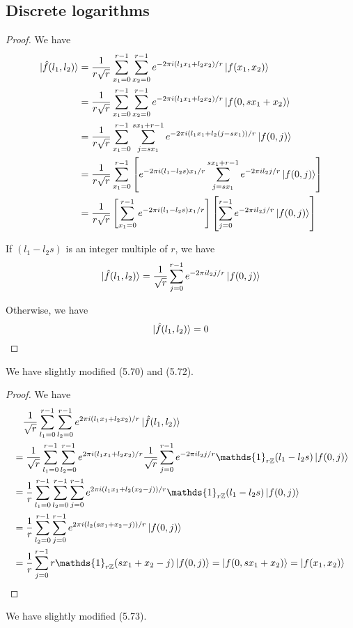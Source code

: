\documentclass[../main.tex]{subfiles}
\begin{document}
\subsection{Discrete logarithms}
\begin{exercise}
\end{exercise}
\begin{proof}
We have
\begin{align*}
    \ket{\hat{f}(l_1,l_2)}
    &= \frac{1}{r\sqrt{r}} \sum_{x_1=0}^{r-1}\sum_{x_2=0}^{r-1}e^{-2\pi i(l_1x_1+l_2x_2)/r}\ket{f(x_1,x_2)} \\
    &= \frac{1}{r\sqrt{r}} \sum_{x_1=0}^{r-1}\sum_{x_2=0}^{r-1}e^{-2\pi i(l_1x_1+l_2x_2)/r}\ket{f(0,s x_1+x_2)} \\
    &= \frac{1}{r\sqrt{r}} \sum_{x_1=0}^{r-1}\sum_{j=s x_1}^{s x_1+r-1}e^{-2\pi i(l_1x_1+l_2(j-s x_1))/r}\ket{f(0,j)} \\
    &= \frac{1}{r\sqrt{r}} \sum_{x_1=0}^{r-1}\left[e^{-2\pi i(l_1-l_2 s)x_1/r}\sum_{j=s x_1}^{s x_1+r-1}e^{-2\pi i l_2 j/r}\ket{f(0,j)}\right] \\
    &= \frac{1}{r\sqrt{r}} \left[\sum_{x_1=0}^{r-1}e^{-2\pi i(l_1-l_2 s)x_1/r}\right]\left[\sum_{j=0}^{r-1}e^{-2\pi i l_2 j/r}\ket{f(0,j)}\right]
\end{align*}

If $(l_1-l_2 s)$ is an integer multiple of $r$, we have
\[
    \ket{\hat{f}(l_1,l_2)}=\frac{1}{\sqrt{r}}\sum_{j=0}^{r-1}e^{-2\pi i l_2 j/r}\ket{f(0,j)}
\]

Otherwise, we have
\[
    \ket{\hat{f}(l_1,l_2)}=0
\]
\end{proof}
\begin{remark}
We have slightly modified (5.70) and (5.72).
\end{remark}

\bigskip
\begin{exercise}
\end{exercise}
\begin{proof}
We have
\begin{align*}
    &\quad\frac{1}{\sqrt{r}}\sum_{l_1=0}^{r-1}\sum_{l_2=0}^{r-1}e^{2\pi i(l_1x_1+l_2x_2)/r}\ket{\hat{f}(l_1,l_2)} \\
    &= \frac{1}{\sqrt{r}}\sum_{l_1=0}^{r-1}\sum_{l_2=0}^{r-1}e^{2\pi i(l_1x_1+l_2x_2)/r}\frac{1}{\sqrt{r}}\sum_{j=0}^{r-1}e^{-2\pi i l_2 j/r}\mathds{1}_{r\mathbb{Z}}(l_1-l_2s)\ket{f(0,j)} \\
    &= \frac{1}{r}\sum_{l_1=0}^{r-1}\sum_{l_2=0}^{r-1}\sum_{j=0}^{r-1}e^{2\pi i(l_1x_1+l_2(x_2-j))/r}\mathds{1}_{r\mathbb{Z}}(l_1-l_2s)\ket{f(0,j)} \\
    &= \frac{1}{r}\sum_{l_2=0}^{r-1}\sum_{j=0}^{r-1}e^{2\pi i(l_2(s x_1+x_2-j))/r}\ket{f(0,j)} \\
    &= \frac{1}{r}\sum_{j=0}^{r-1}r\mathds{1}_{r\mathbb{Z}}(s x_1+x_2-j)\ket{f(0,j)} = \ket{f(0,s x_1+x_2)} = \ket{f(x_1,x_2)}
\end{align*}
\end{proof}
\begin{remark}
We have slightly modified (5.73).
\end{remark}
\end{document}
